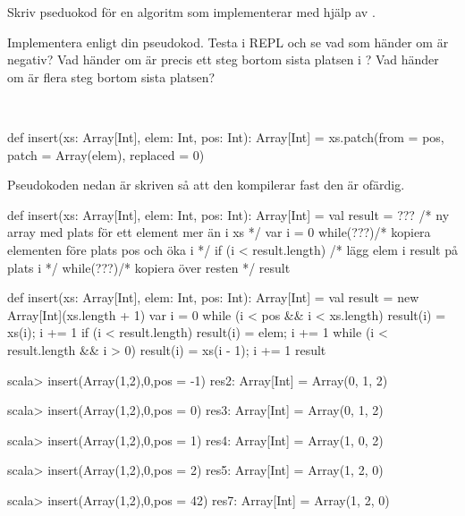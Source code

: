 \Subtask Skriv pseduokod för en algoritm som implementerar  med hjälp av .

\Subtask Implementera  enligt din pseudokod. Testa i REPL och se vad som händer om  är negativ? Vad händer om  är precis ett steg bortom sista platsen i ? Vad händer om  är flera steg bortom sista platsen?

\SOLUTION

\TaskSolved \what~

\SubtaskSolved

\begin{ConceptConnections}

\end{ConceptConnections}

\SubtaskSolved

\begin{Code}
def insert(xs: Array[Int], elem: Int, pos: Int): Array[Int] =
  xs.patch(from = pos, patch = Array(elem), replaced = 0)
\end{Code}

\SubtaskSolved Pseudokoden nedan är skriven så att den kompilerar fast den är ofärdig.
\begin{Code}
def insert(xs: Array[Int], elem: Int, pos: Int): Array[Int] = {
  val result = ??? /* ny array med plats för ett element mer än i xs */
  var i = 0
  while(???){/* kopiera elementen före plats pos och öka i */}
  if (i < result.length) /* lägg elem i result på plats i */
  while(???){/* kopiera över resten */}
  result
}
\end{Code}

\SubtaskSolved
\begin{Code}
def insert(xs: Array[Int], elem: Int, pos: Int): Array[Int] = {
  val result = new Array[Int](xs.length + 1)
  var i = 0
  while (i < pos && i < xs.length) { result(i) = xs(i); i += 1}
  if (i < result.length) { result(i) = elem; i += 1 }
  while (i < result.length && i > 0) { result(i) = xs(i - 1); i += 1}
  result
}
\end{Code}
\begin{REPL}
scala> insert(Array(1,2),0,pos = -1)
res2: Array[Int] = Array(0, 1, 2)

scala> insert(Array(1,2),0,pos = 0)
res3: Array[Int] = Array(0, 1, 2)

scala> insert(Array(1,2),0,pos = 1)
res4: Array[Int] = Array(1, 0, 2)

scala> insert(Array(1,2),0,pos = 2)
res5: Array[Int] = Array(1, 2, 0)

scala> insert(Array(1,2),0,pos = 42)
res7: Array[Int] = Array(1, 2, 0)
\end{REPL}

